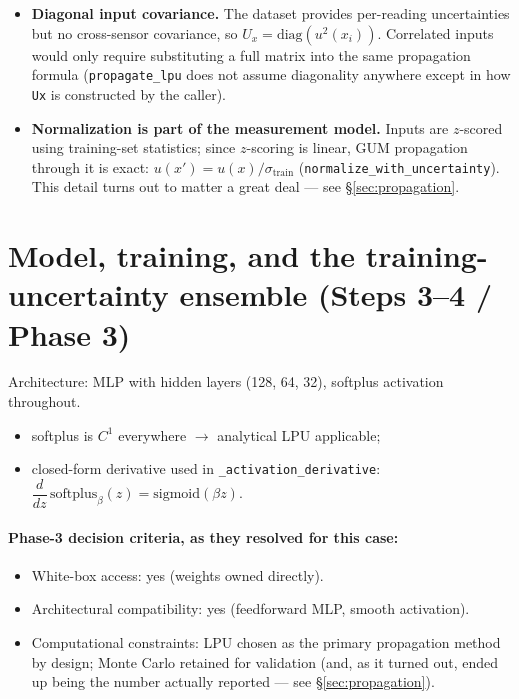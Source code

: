 \documentclass[11pt]{article}
\begin{document}
\begin{itemize}
\item \textbf{Diagonal input covariance.} The dataset provides per-reading
uncertainties but no cross-sensor covariance, so $U_x =
\mathrm{diag}(u^2(x_i))$. Correlated inputs would only require substituting
a full matrix into the same propagation formula (\texttt{propagate\_lpu}
does not assume diagonality anywhere except in how \texttt{Ux} is
constructed by the caller).
\item \textbf{Normalization is part of the measurement model.} Inputs are
$z$-scored using training-set statistics; since $z$-scoring is linear, GUM
propagation through it is exact: $u(x') = u(x)/\sigma_{\text{train}}$
(\texttt{normalize\_with\_uncertainty}). This detail turns out to matter a
great deal --- see \S\ref{sec:propagation}.
\end{itemize}

\section{Model, training, and the training-uncertainty ensemble (Steps 3--4 / Phase 3)}
\label{sec:model}

Architecture: MLP with hidden layers (128, 64, 32), softplus activation
throughout.

\begin{itemize}
\item softplus is $C^1$ everywhere $\rightarrow$ analytical LPU applicable;
\item closed-form derivative used in \texttt{\_activation\_derivative}:
$\dfrac{d}{dz}\,\mathrm{softplus}_\beta(z) = \mathrm{sigmoid}(\beta z)$.
\end{itemize}

\paragraph{Phase-3 decision criteria, as they resolved for this case:}
\begin{itemize}
\item White-box access: yes (weights owned directly).
\item Architectural compatibility: yes (feedforward MLP, smooth activation).
\item Computational constraints: LPU chosen as the primary propagation
method by design; Monte Carlo retained for validation (and, as it turned
out, ended up being the number actually reported --- see
\S\ref{sec:propagation}).
\end{itemize}
\end{document}
